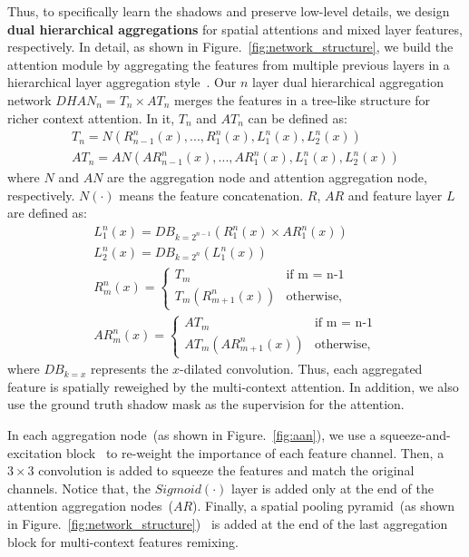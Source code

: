 \documentclass[letterpaper]{article} \usepackage{aaai20}  \usepackage{times}  \usepackage{helvet} \usepackage{courier}  \usepackage[hyphens]{url}  \urlstyle{rm} \def\UrlFont{\rm}  \usepackage{graphicx}  \frenchspacing  \setlength{\pdfpagewidth}{8.5in}  \setlength{\pdfpageheight}{11in}  \usepackage{amssymb}
\begin{document}
Thus, to specifically learn the shadows and preserve low-level details, we design \textbf{dual hierarchical aggregations} for spatial attentions and mixed layer features, respectively. In detail, as shown in Figure.~\ref{fig:network_structure}, we build the attention module by aggregating the features from multiple previous layers in a hierarchical layer aggregation style~\cite{Yu:2017ts}. Our $n$ layer dual hierarchical aggregation network $DHAN_{n} = T_{n} \times AT_{n}$ merges the features in a tree-like structure for richer context attention. In it, $T_{n}$ and $AT_{n}$ can be defined as:
\begin{equation}
\begin{aligned}
T_{n} = N(R^n_{n-1}(x),...,R^n_{1}(x),
L^n_1(x),L^n_2(x))\\
AT_{n} = AN(AR^n_{n-1}(x),...,AR^n_{1}(x),L^n_1(x),L^n_2(x))
\end{aligned}
\end{equation}
where $N$ and $AN$ are the aggregation node and attention aggregation node, respectively. $N(\cdot) $ means the feature concatenation. $R$, $AR$ and feature layer $L$ are defined as:
\begin{equation}
\begin{aligned}
L^n_1(x) = DB_{k=2^{n-1}}(R^n_1(x)\times AR^n_1(x))\\
L^n_2(x) = DB_{k=2^{n}}(L^n_1(x))\\
R^n_m(x)=
\begin{cases}
T_m& \text{if m = n-1}\\
T_m(R^n_{m+1}(x))& \text{otherwise,}
\end{cases}
\\
AR^n_m(x)=
\begin{cases}
AT_m& \text{if m = n-1}\\
AT_m(AR^n_{m+1}(x))& \text{otherwise,}
\end{cases}
\end{aligned}
\end{equation}
where $DB_{k=x}$ represents the $x$-dilated convolution.  
Thus, each aggregated feature is spatially reweighed by the multi-context attention. In addition, we also use the ground truth shadow mask as the supervision for the attention. 

In each aggregation node~(as shown in Figure.~\ref{fig:aan}), we use a squeeze-and-excitation block~\cite{hu2018squeeze} to re-weight the importance of each feature channel. Then, a $3\times3$ convolution is added to squeeze the features and match the original channels. Notice that, the $Sigmoid(\cdot)$ layer is added only at the end of the attention aggregation nodes~($AR$). Finally, a spatial pooling pyramid~(as shown in Figure.~\ref{fig:network_structure})~\cite{he2015spatial} is added at the end of the last aggregation block for multi-context features remixing.
\end{document}
